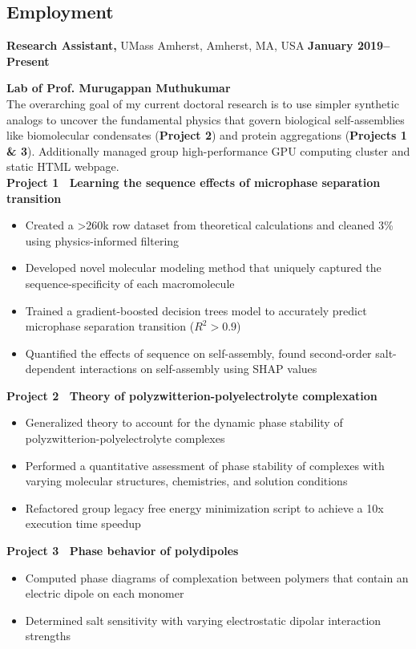\documentclass[margin,line]{res}
\begin{document}
\begin{resume}
	\section{\sc Employment}
	 {\bf Research Assistant,} UMass Amherst, Amherst, MA, USA
	\hfill {\bf January 2019--Present}
	\begin{adjustwidth}{1.5em}{0pt}
		{\bf Lab of Prof. Murugappan Muthukumar}\\
		The overarching goal of my current doctoral research is to use simpler
		synthetic analogs to uncover the fundamental physics that govern biological
		self-assemblies like biomolecular condensates ({\bf Project 2}) and protein
		aggregations ({\bf Projects 1 \& 3}). Additionally managed group
		high-performance GPU computing cluster and static HTML webpage.
		\\
		{\bf Project 1~\textendash{} Learning the sequence effects of microphase
		separation transition}
		\begin{itemize}
			\item Created a >260k row dataset from theoretical calculations and
			      cleaned 3\% using physics-informed filtering
			\item Developed novel molecular modeling method that uniquely captured
			      the sequence-specificity of each macromolecule
			\item Trained a gradient-boosted decision trees model to accurately
			      predict microphase separation transition ($R^{2} > 0.9$)
			\item Quantified the effects of sequence on self-assembly, found
			      second-order salt-dependent interactions on self-assembly using SHAP
			      values
		\end{itemize}
		{\bf Project 2~\textendash{} Theory of polyzwitterion-polyelectrolyte
		complexation}
		\begin{itemize}
			\item Generalized theory to account for the dynamic phase stability of
			      polyzwitterion-polyelectrolyte complexes
			\item Performed a quantitative assessment of phase stability of complexes
			      with varying molecular structures, chemistries, and solution conditions
			\item Refactored group legacy free energy minimization script to
			      achieve a 10x execution time speedup
		\end{itemize}
		{\bf Project 3~\textendash{} Phase behavior of polydipoles}
		\begin{itemize}
			\item Computed phase diagrams of complexation between polymers that
			      contain an electric dipole on each monomer
			\item Determined salt sensitivity with varying electrostatic dipolar
			      interaction strengths
		\end{itemize}
	\end{adjustwidth}


\end{resume}
\end{document}
